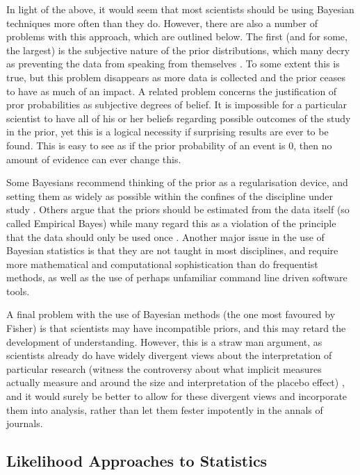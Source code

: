 In light of the above, it would seem that most scientists should be using Bayesian techniques more often than they do. However, there are also a number of problems with this approach, which are outlined below. The first (and for some, the largest) is the subjective nature of the prior distributions, which many decry as preventing the data from speaking from themselves \cite{gelman2010philosophy}. To some extent this is true, but this problem disappears as more data is collected and the prior ceases to have as much of an impact. A related problem concerns the justification of pror probabilities as subjective degrees of belief. It is impossible for a particular scientist to have all of his or her beliefs regarding possible outcomes of the study in the prior, yet this is a logical necessity if surprising results are ever to be found\cite{gelman2010philosophy}. This is easy to see as if the prior probability of an event is 0, then no amount of evidence can ever change this. 

Some Bayesians  recommend thinking of the prior as a regularisation device, and setting them as widely as possible within the confines of the discipline under study \cite{gelman2010philosophy}. Others argue that the priors should be estimated from the data itself (so called Empirical Bayes) \cite{carlin2009bayesian} while many regard this as a violation of the principle that the data should only be used once \cite{gill2002bayesian}. Another major issue in the use of Bayesian statistics is that they are not taught in most disciplines, and require more mathematical and computational sophistication than do frequentist methods, as well as the use of perhaps unfamiliar command line driven software tools. 

A final problem with the use of Bayesian methods (the one most favoured by Fisher) \cite{salsburg2002lady} is that scientists may have incompatible priors, and this may retard the development of understanding. However, this is a straw man argument, as scientists already do have widely divergent views about the interpretation of particular research (witness the controversy about what implicit measures actually measure and around the size and interpretation of the placebo effect) , and it would surely be better to allow for these divergent views and incorporate them into analysis, rather than let them fester impotently in the annals of journals.

\subsection{Likelihood Approaches to Statistics}

